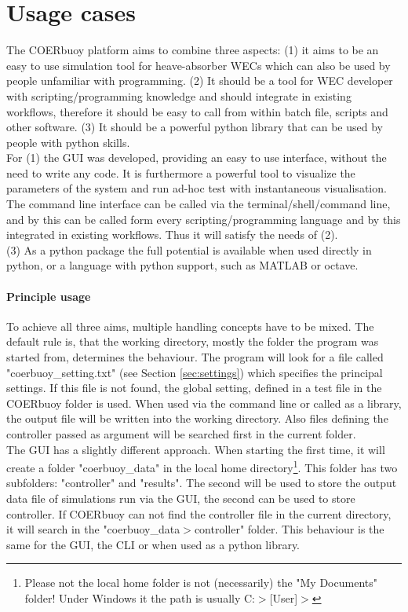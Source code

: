 \documentclass[oneside,10pt,a4paper]{book}
\begin{document}
\section{Usage cases}
The COERbuoy platform aims to combine three aspects: (1) it aims to be an easy to use simulation tool for heave-absorber WECs which can also be used by people unfamiliar with programming. (2) It should be a tool for WEC developer with scripting/programming knowledge and should integrate in existing workflows, therefore it should be easy to call from within batch file, scripts and other software. (3) It should be a powerful python library that can be used by people with python skills.\\
For (1) the GUI was developed, providing an easy to use interface, without the need to write any code. It is furthermore a powerful tool to visualize the parameters of the system and run ad-hoc test with instantaneous visualisation.\\
The command line interface can be called via the terminal/shell/command line, and by this can be called form every scripting/programming language and by this integrated in existing workflows. Thus it will satisfy the needs of (2).\\
(3) As a python package the full potential is available when used directly in python, or a language with python support, such as MATLAB or octave.
\paragraph{Principle usage}
To achieve all three aims, multiple handling concepts have to be mixed. The default rule is, that the working directory, mostly the folder the program was started from, determines the behaviour. The program will look for a file called "coerbuoy\_setting.txt" (see Section \ref{sec:settings}) which specifies the principal settings. If this file is not found, the global setting, defined in a test file in the COERbuoy folder is used. When used via the command line or called as a library, the output file will be written into the working directory. Also files defining the controller passed as argument will be searched first in the current folder.\\
The GUI has a slightly different approach. When starting the first time, it will create a folder "coerbuoy\_data" in the local home directory\footnote{Please not the local home folder is not (necessarily) the "My Documents" folder! Under Windows it the path is usually C:$>$[User]$>$}. This folder has two subfolders: "controller" and "results". The second will be used to store the output data file of simulations run via the GUI, the second can be used to store controller. If COERbuoy can not find the controller file in the current directory, it will search in the "coerbuoy\_data$>$controller" folder. This behaviour is the same for the GUI, the CLI or when used as a python library. 
\end{document}
